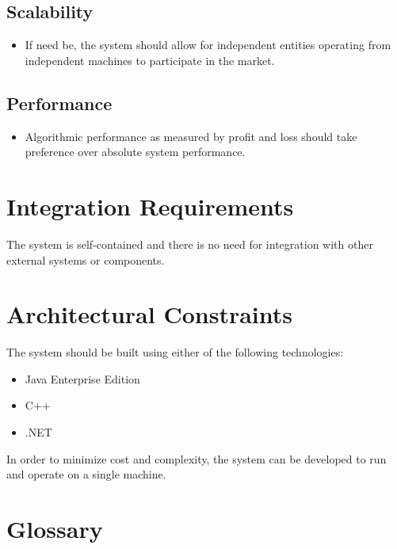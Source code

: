 \documentclass[12pt]{article}
\begin{document}
		\subsection{Scalability}
		\begin{itemize}
		\item If need be, the system should allow for independent entities operating from independent machines to participate in the market.
		\end{itemize}
		\subsection{Performance}
		\begin{itemize}
		\item Algorithmic performance as measured by profit and loss should take preference over absolute system performance. 
		\end{itemize}
	\section{Integration Requirements}
	The system is self-contained and there is no need for integration with other external systems or components.
	\section{Architectural Constraints}
	The system should be built using either of the following technologies:
	\begin{itemize}
	\item Java Enterprise Edition
	\item C++
	\item .NET
	\end{itemize}
	In order to minimize cost and complexity, the system can be developed to run and operate on a single machine. 
		
	\newpage				    
	\section{Glossary}				    			    			    		
\end{document}
